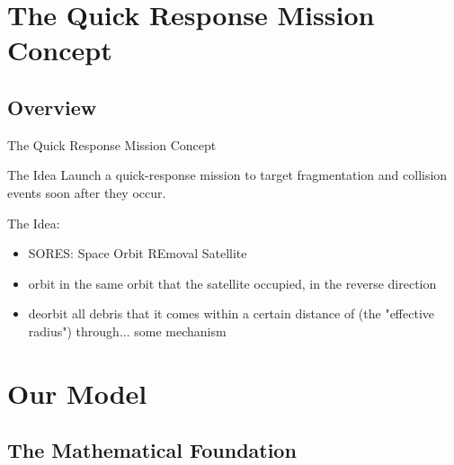 \documentclass{beamer}
\begin{document}
\section{The Quick Response Mission Concept}

\subsection{Overview}

\begin{frame}{The Quick Response Mission Concept}
 \begin{block}{The Idea}
Launch a quick-response mission to target fragmentation and collision events soon after they occur.
\end{block}
  The Idea: 
  \begin{itemize}
  \item{SORES: Space Orbit REmoval Satellite
  }
  \item {
    orbit in the same orbit that the satellite occupied, in the reverse direction
  }
  \item {
    deorbit all debris that it comes within a certain distance of (the "effective radius") through... some mechanism
  }
  \end{itemize}
\end{frame}



\section{Our Model}

\subsection{The Mathematical Foundation}
\end{document}
